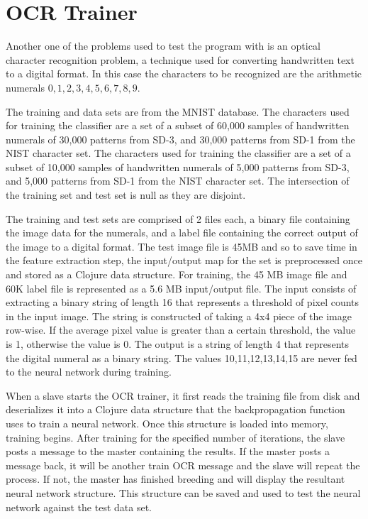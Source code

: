 \chapter[OCR Trainer]{OCR Trainer}
Another one of the problems used to test the program with is an
optical character recognition problem, a technique used for converting
handwritten text to a digital format. 
In this case the characters to be recognized are the arithmetic numerals $0,1,2,3,4,5,6,7,8,9$.

The training and data sets are from the MNIST database\cite{mnist}.
The characters used for training the classifier are a set of a subset of 60,000 samples of handwritten numerals of 30,000 patterns from SD-3, and 30,000 patterns from SD-1 from the NIST character set. 
The characters used for training the classifier are a set of a subset of 10,000 samples of handwritten numerals of 5,000 patterns from SD-3, and 5,000 patterns from SD-1 from the NIST character set. 
The intersection of the training set and test set is null as they are disjoint.

The training and test sets are comprised of 2 files each, a binary file containing the image data for the numerals, and a label file containing the correct output of the image to a digital format. 
The test image file is 45MB and so to save time in the feature extraction step, the input/output map for the set is preprocessed once and stored as a Clojure data structure. 
For training, the 45 MB image file and 60K label file is represented as a 5.6 MB input/output file. 
The input consists of extracting a binary string of length 16 that represents a threshold of pixel counts in the input image. 
The string is constructed of taking a 4x4 piece of the image row-wise. 
If the average pixel value is greater than a certain threshold, the value is 1, otherwise the value is 0. 
The output is a string of length 4 that represents the digital numeral as a binary string. 
The values 10,11,12,13,14,15 are never fed to the neural network during training.

When a slave starts the OCR trainer, it first reads the training file from disk and deserializes it into a Clojure data structure that the backpropagation function uses to train a neural network. 
Once this structure is loaded into memory, training begins. 
After training for the specified number of iterations, the slave posts a message to the master containing the results. 
If the master posts a message back, it will be another train OCR
message and the slave will repeat the process. 
If not, the master has finished breeding and will display the resultant neural network structure. 
This structure can be saved and used to test the neural network
against the test data set.

